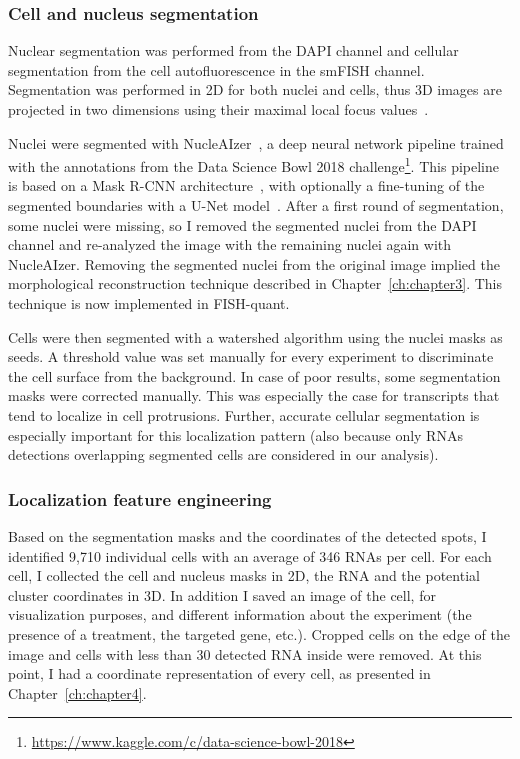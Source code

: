 \subsubsection{Cell and nucleus segmentation}

Nuclear segmentation was performed from the DAPI channel and cellular segmentation from the cell autofluorescence in the \ac{smFISH} channel.
Segmentation was performed in 2D for both nuclei and cells, thus 3D images are projected in two dimensions using their maximal local focus values~\cite{tsanov_smifish_2016}.

Nuclei were segmented with NucleAIzer~\cite{hollandi_nucleaizer_2020}, a deep neural network pipeline trained with the annotations from the Data Science Bowl 2018 challenge\footnote{\url{https://www.kaggle.com/c/data-science-bowl-2018}}.
This pipeline is based on a Mask R-CNN architecture~\cite{He_2017_ICCV}, with optionally a fine-tuning of the segmented boundaries with a U-Net model~\cite{Ronneberger_2015}.
After a first round of segmentation, some nuclei were missing, so I removed the segmented nuclei from the DAPI channel and re-analyzed the image with the remaining nuclei again with NucleAIzer.
Removing the segmented nuclei from the original image implied the morphological reconstruction technique described in Chapter~\ref{ch:chapter3}.
This technique is now implemented in FISH-quant.

Cells were then segmented with a watershed algorithm using the nuclei masks as seeds.
A threshold value was set manually for every experiment to discriminate the cell surface from the background.
In case of poor results, some segmentation masks were corrected manually.
This was especially the case for transcripts that tend to localize in cell protrusions.
Further, accurate cellular segmentation is especially important for this localization pattern (also because only RNAs detections overlapping segmented cells are considered in our analysis).

\subsubsection{Localization feature engineering}

Based on the segmentation masks and the coordinates of the detected spots, I identified 9,710 individual cells with an average of 346 \ac{RNA}s per cell.
For each cell, I collected the cell and nucleus masks in 2D, the \ac{RNA} and the potential cluster coordinates in 3D.
In addition I saved an image of the cell, for visualization purposes, and different information about the experiment (the presence of a treatment, the targeted gene, etc.).
Cropped cells on the edge of the image and cells with less than 30 detected \ac{RNA} inside were removed.
At this point, I had a coordinate representation of every cell, as presented in Chapter~\ref{ch:chapter4}.

